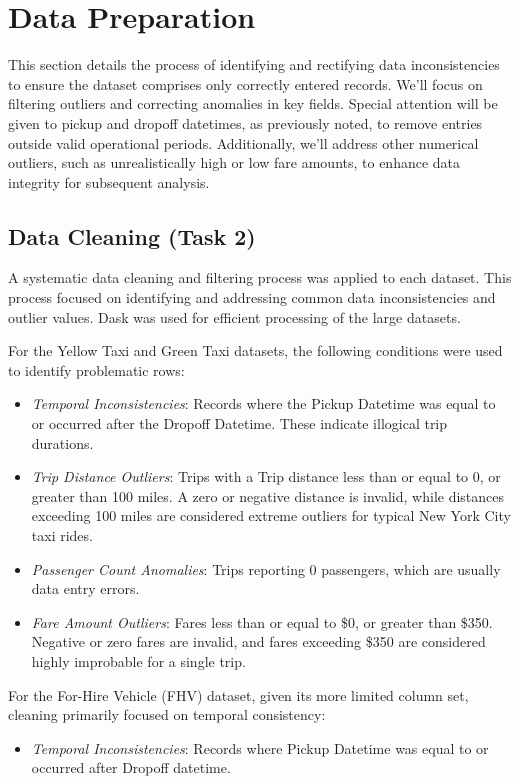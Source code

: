 \documentclass[conference]{IEEEtran}
\begin{document}
\section{Data Preparation}

This section details the process of identifying and rectifying data inconsistencies to ensure the dataset comprises only
correctly entered records. We'll focus on filtering outliers and correcting anomalies in key fields. Special attention
will be given to pickup and dropoff datetimes, as previously noted, to remove entries outside valid operational periods.
Additionally, we'll address other numerical outliers, such as unrealistically high or low fare amounts, to enhance data
integrity for subsequent analysis.

\subsection{Data Cleaning (Task 2)}
A systematic data cleaning and filtering process was applied to each dataset. This process focused on identifying and
addressing common data inconsistencies and outlier values. Dask was used for efficient processing of the large datasets.

For the Yellow Taxi and Green Taxi datasets, the following conditions were used to identify problematic rows:
\begin{itemize}
  \item \emph{Temporal Inconsistencies}: Records where the Pickup Datetime was equal to or occurred after the
    Dropoff Datetime. These indicate illogical trip durations.
  \item \emph{Trip Distance Outliers}: Trips with a Trip distance less than or equal to 0, or greater than 100 miles. A
    zero or negative distance is invalid, while distances exceeding 100 miles are considered extreme outliers for
    typical New York City taxi rides.
  \item \emph{Passenger Count Anomalies}: Trips reporting 0 passengers, which are usually data entry errors.
  \item \emph{Fare Amount Outliers}: Fares less than or equal to \$0, or greater than \$350. Negative or zero fares are
    invalid, and fares exceeding \$350 are considered highly improbable for a single trip.
\end{itemize}

For the For-Hire Vehicle (FHV) dataset, given its more limited column set, cleaning primarily focused on temporal consistency:
\begin{itemize}
  \item \emph{Temporal Inconsistencies}: Records where Pickup Datetime was equal to or occurred after Dropoff datetime.
\end{itemize}
\end{document}
